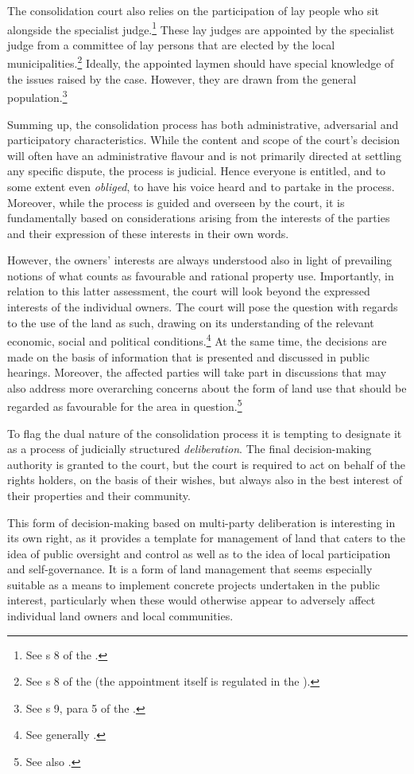 The consolidation court also relies on the participation of lay people who sit alongside the specialist judge.\footnote{See s 8 of the \cite{lca79}.} These lay judges are appointed by the specialist judge from a committee of lay persons that are elected by the local municipalities.\footnote{See s 8 of the \cite{lca79} (the appointment itself is regulated in the \cite[64]{ca15}).} Ideally, the appointed laymen should have special knowledge of the issues raised by the case. However, they are drawn from the general population.\footnote{See s 9, para 5 of the \cite{lca79}.}

Summing up, the consolidation process has both administrative, adversarial and participatory characteristics. While the content and scope of the court's decision will often have an administrative flavour and is not primarily directed at settling any specific dispute, the process is judicial. Hence everyone is entitled, and to some extent even \emph{obliged}, to have his voice heard and to partake in the process. Moreover, while the process is guided and overseen by the court, it is fundamentally based on considerations arising from the interests of the parties and their  expression of these interests in their own words.

However, the owners' interests are always understood also in light of prevailing notions of what counts as favourable and rational property use. Importantly, in relation to this latter assessment, the court will look beyond the expressed interests of the individual owners. The court will pose the question with regards to the use of the land as such, drawing on its understanding of the relevant economic, social and political conditions.\footnote{See generally \cite{reiten09,sky09}.} At the same time, the decisions are made on the basis of information that is presented and discussed in public hearings. Moreover, the affected parties will take part in discussions that may also address more overarching concerns about the form of land use that should be regarded as favourable for the area in question.\footnote{See also \cite{rognes07}.}

To flag the dual nature of the consolidation process it is tempting to designate it as a process of judicially structured \emph{deliberation}. The final decision-making authority is granted to the court, but the court is required to act on behalf of the rights holders, on the basis of their wishes, but always also in the best interest of their properties and their community. 

This form of decision-making based on multi-party deliberation is interesting in its own right, as it provides a template for management of land that caters to the idea of public oversight and control as well as to the idea of local participation and self-governance. It is a form of land management that seems especially suitable as a means to implement concrete projects undertaken in the public interest, particularly when these would otherwise appear to adversely affect individual land owners and local communities.

